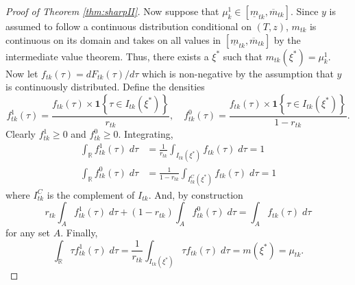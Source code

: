 \begin{proof}[Proof of Theorem \ref{thm:sharpII}]
Now suppose that $\mu^1_{k} \in \left[\underline{m}_{tk}, \overline{m}_{tk} \right]$.
Since $y$ is assumed to follow a continuous distribution conditional on $(T,z)$, $m_{tk}$ is continuous on its domain and takes on all values in $\left[ \underline{m}_{tk}, \overline{m}_{tk} \right]$ by the intermediate value theorem.
Thus, there exists a $\xi^*$ such that $m_{tk}(\xi^*) = \mu^1_{k}$.
Now let $f_{tk}(\tau) = dF_{tk}(\tau)/d\tau$ which is non-negative by the assumption that $y$ is continuously distributed.
Define the densities
\[
  f^1_{tk}(\tau) = \frac{f_{tk}(\tau)\times \mathbf{1}\left\{ \tau \in I_{tk}(\xi^*) \right\}}{r_{tk}}, \quad
  f^0_{tk}(\tau) = \frac{f_{tk}(\tau) \times \mathbf{1}\left\{ \tau \in I_{tk}(\xi^*) \right\}}{1 - r_{tk}}.
\]
Clearly $f_{tk}^1\geq 0$ and $f^0_{tk} \geq 0$.
Integrating, 
\begin{align*}
  \int_{\mathbb{R}} f_{tk}^1(\tau) \; d\tau &= \frac{1}{r_{tk}}\int_{I_{tk}(\xi^*)} f_{tk}(\tau)\; d\tau = 1\\
  \int_{\mathbb{R}} f_{tk}^0(\tau) \; d\tau &= \frac{1}{1 - r_{tk}}\int_{I^C_{tk}(\xi^*)} f_{tk}(\tau)\; d\tau = 1
\end{align*}
where $I_{tk}^C$ is the complement of $I_{tk}$.
And, by construction
\[
  r_{tk} \int_A f_{tk}^1(\tau) \; d\tau + (1 - r_{tk}) \int_A f_{tk}^0(\tau) \; d\tau = \int_A f_{tk}(\tau)\; d\tau
\]
for any set $A$. 
Finally,
\[
  \int_{\mathbb{R}} \tau f_{tk}^1(\tau) \; d\tau = \frac{1}{r_{tk}} \int_{I_{tk}(\xi^*)} \tau f_{tk}(\tau)\; d\tau = m(\xi^*) = \mu_{tk}.
\]


\end{proof}


